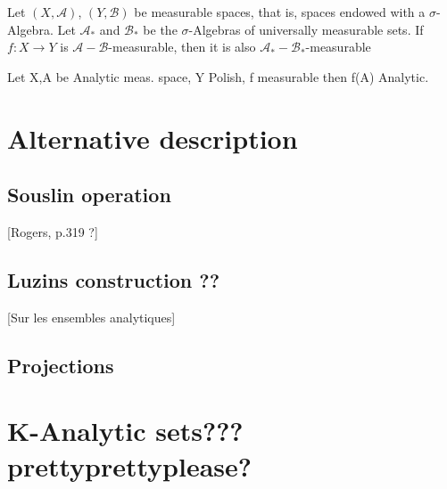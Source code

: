 \documentclass[10pt, a4paper, titlepage]{article}
\numberwithin{equation}{section}
\begin{document}
\begin{theorem}
	Let $(X,\mathcal{A})$,  $\left( Y, \mathcal{B} \right) $ be measurable spaces, that is, spaces endowed with a $\sigma$-Algebra.  
	Let $\mathcal{A}_*$ and $\mathcal{B}_*$ be the $\sigma$-Algebras of universally measurable sets.
	If  $f:X \to Y$ is  $\mathcal{A}- \mathcal{B}$-measurable, then it is also $\mathcal{A}_*-\mathcal{B}_*$-measurable
\end{theorem}


\begin{definition}
	
\end{definition}

\begin{theorem}
	Let X,A be Analytic meas. space, Y Polish, f measurable then f(A) Analytic.
\end{theorem}




\section{Alternative description}


\subsection{Souslin operation}
[Rogers, p.319 ?]

\subsection{Luzins construction ??}
[Sur les ensembles analytiques]




 \subsection{Projections}



\section{K-Analytic sets??? prettyprettyplease?}































\vspace{\fill}
\printbibliography{}
\end{document}
